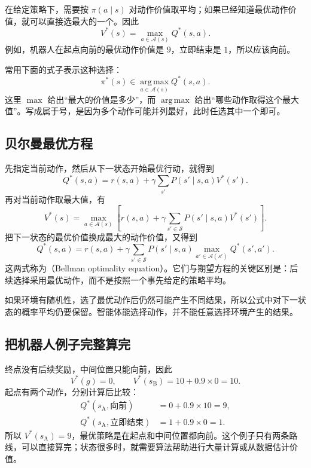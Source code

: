 \documentclass[UTF8]{ctexart}
\begin{document}
在给定策略下，需要按 $\pi(a\mid s)$ 对动作价值取平均；如果已经知道最优动作价值，就可以直接选最大的一个。因此
\begin{equation}
  V^*(s)=\max_{a\in\mathcal A(s)}Q^*(s,a).
  \label{eq:mdp-optimal-vq}
\end{equation}
例如，机器人在起点向前的最优动作价值是 $9$，立即结束是 $1$，所以应该向前。

常用下面的式子表示这种选择：
\[
  \pi^*(s)\in\operatorname*{arg\,max}_{a\in\mathcal A(s)}Q^*(s,a).
\]
这里 $\max$ 给出“最大的价值是多少”，而 $\operatorname*{arg\,max}$ 给出“哪些动作取得这个最大值”。写成属于号，是因为多个动作可能并列最好，此时任选其中一个即可。

\subsection{贝尔曼最优方程}

先指定当前动作，然后从下一状态开始最优行动，就得到
\[
  Q^*(s,a)=r(s,a)+\gamma\sum_{s'}P(s'\mid s,a)V^*(s').
\]
再对当前动作取最大值，有
\begin{equation}
  V^*(s)=\max_{a\in\mathcal A(s)}
  \left[r(s,a)+\gamma\sum_{s'\in\mathcal S}P(s'\mid s,a)V^*(s')\right].
  \label{eq:mdp-optimal-bellman-v}
\end{equation}
把下一状态的最优价值换成最大的动作价值，又得到
\begin{equation}
  Q^*(s,a)=r(s,a)+\gamma\sum_{s'\in\mathcal S}P(s'\mid s,a)
  \max_{a'\in\mathcal A(s')}Q^*(s',a').
  \label{eq:mdp-optimal-bellman-q}
\end{equation}
这两式称为（Bellman optimality equation）。它们与期望方程的关键区别是：后续选择采用最优动作，而不是按照一个事先给定的策略平均。

如果环境有随机性，选了最优动作后仍然可能产生不同结果，所以公式中对下一状态的概率平均仍要保留。智能体能选择动作，并不能任意选择环境产生的结果。

\subsection{把机器人例子完整算完}

终点没有后续奖励，中间位置只能向前，因此
\[
  V^*(g)=0,\qquad V^*(s_{\mathrm B})=10+0.9\times0=10.
\]
起点有两个动作，分别计算后比较：
\begin{align*}
  Q^*(s_{\mathrm A},\text{向前})&=0+0.9\times10=9,\\
  Q^*(s_{\mathrm A},\text{立即结束})&=1+0.9\times0=1.
\end{align*}
所以 $V^*(s_{\mathrm A})=9$，最优策略是在起点和中间位置都向前。这个例子只有两条路线，可以直接算完；状态很多时，就需要算法帮助进行大量计算或从数据估计价值。
\end{document}
